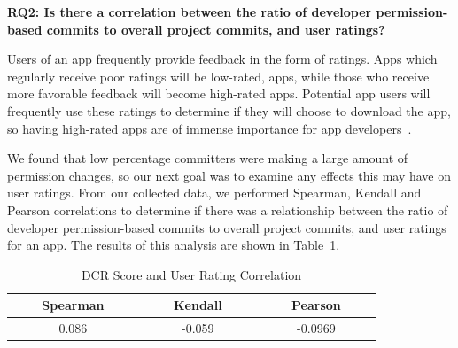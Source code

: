\documentclass{sig-alternate-05-2015}
\newcommand{\todo}[1]{\textcolor{cyan}{\textbf{[#1]}}}
\begin{document}









\vspace{5mm}
\textbf{RQ2: Is there a correlation between the ratio of developer permission-based commits to overall project commits, and user ratings?}

Users of an app frequently provide feedback in the form of ratings. Apps which regularly receive poor ratings will be low-rated, apps, while those who receive more favorable feedback will become high-rated apps. Potential app users will frequently use these ratings to determine if they will choose to download the app, so having high-rated apps are of immense importance for app developers~\cite{Khalid_Mei_Examinging, al2015app, fu2013people}.






We found that low percentage committers were making a large amount of permission changes, so our next goal was to examine any effects this may have on user ratings. From our collected data, we performed Spearman, Kendall and Pearson correlations to determine if there was a relationship between the ratio of developer permission-based commits to overall project commits, and user ratings for an app. The results of this analysis are shown in Table~\ref{Table:userRationCorrelation}.



 \begin{table}[h]
\begin{center}
\caption{DCR Score and User Rating Correlation}
\label{Table:userRationCorrelation}
 \begin{tabular}{ | c | c | c | } \hline

    \bfseries ~~~~Spearman~~~~ & \bfseries ~~~~Kendall~~~~ & \bfseries ~~~~Pearson~~~~  \\ \hline \hline
    0.086 & -0.059 & -0.0969 \\ \hline


  \end{tabular}
  \end{center}
\end{table}
\end{document}
